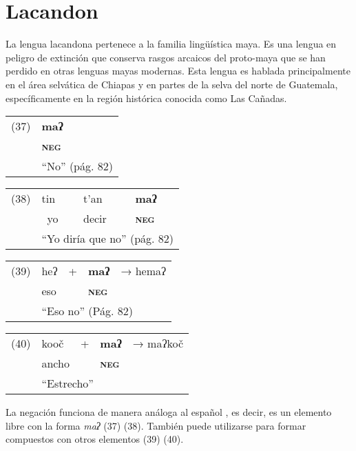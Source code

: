 \section*{Lacandon}

\noindent La lengua lacandona pertenece a la familia lingüística maya. Es una lengua en peligro de extinción que conserva rasgos arcaicos del proto-maya que se han perdido en otras lenguas mayas modernas. Esta lengua es hablada principalmente en el área selvática de Chiapas y en partes de la selva del norte de Guatemala, específicamente en la región histórica conocida como Las Cañadas. \vspace{0.5cm}

{\setmainfont{Charis SIL} 
\begin{tabular}{ll}
(37) & \textbf{maʔ}  \\
& \textsc{\textbf{neg}} \\
& ``No'' (pág. 82)
\end{tabular} \vspace{0.5cm}

\begin{tabular}{llll}
(38) & tin & t'an & \textbf{maʔ} \\
& \ yo & decir & \textsc{\textbf{neg}} \\
& \multicolumn{3}{l}{``Yo diría que no'' (pág. 82)}
\end{tabular} \vspace{0.5cm}

\begin{tabular}{lllll}
(39) & heʔ & + & \textbf{maʔ} & → hemaʔ \\
& eso & & \textsc{\textbf{neg}} & \\
& \multicolumn{4}{l}{``Eso no'' (Pág. 82)}
\end{tabular} \vspace{0.5cm}

\begin{tabular}{lllll}
(40) & kooč & + & \textbf{maʔ} & → maʔkoč \\
& ancho & & \textsc{\textbf{neg}} & \\
& \multicolumn{4}{l}{``Estrecho''}
\end{tabular} \vspace{0.5cm}
}

La negación funciona de manera análoga al español \textcolor{MidnightBlue}{\citep{lacandon}}, es decir, es un elemento libre con la forma {\setmainfont{Charis SIL} \textit{maʔ}} (37) (38). También puede utilizarse para formar compuestos con otros elementos (39) (40).